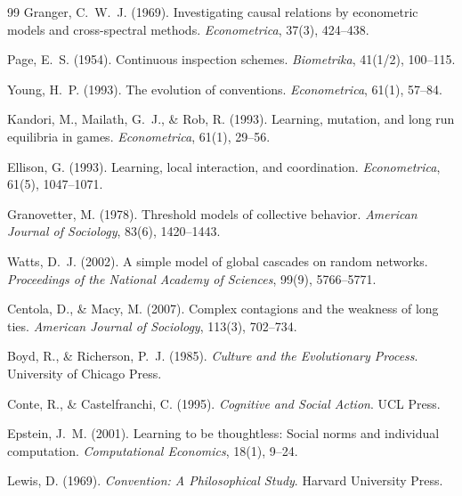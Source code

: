 \documentclass[11pt,a4paper]{article}
\begin{document}
\begin{thebibliography}{99}
Granger, C.~W.~J. (1969).
Investigating causal relations by econometric models and cross-spectral methods.
\textit{Econometrica}, 37(3), 424--438.

Page, E.~S. (1954).
Continuous inspection schemes.
\textit{Biometrika}, 41(1/2), 100--115.

Young, H.~P. (1993).
The evolution of conventions.
\textit{Econometrica}, 61(1), 57--84.

Kandori, M., Mailath, G.~J., \& Rob, R. (1993).
Learning, mutation, and long run equilibria in games.
\textit{Econometrica}, 61(1), 29--56.

Ellison, G. (1993).
Learning, local interaction, and coordination.
\textit{Econometrica}, 61(5), 1047--1071.

Granovetter, M. (1978).
Threshold models of collective behavior.
\textit{American Journal of Sociology}, 83(6), 1420--1443.

Watts, D.~J. (2002).
A simple model of global cascades on random networks.
\textit{Proceedings of the National Academy of Sciences}, 99(9), 5766--5771.

Centola, D., \& Macy, M. (2007).
Complex contagions and the weakness of long ties.
\textit{American Journal of Sociology}, 113(3), 702--734.

Boyd, R., \& Richerson, P.~J. (1985).
\textit{Culture and the Evolutionary Process}.
University of Chicago Press.

Conte, R., \& Castelfranchi, C. (1995).
\textit{Cognitive and Social Action}.
UCL Press.

Epstein, J.~M. (2001).
Learning to be thoughtless: Social norms and individual computation.
\textit{Computational Economics}, 18(1), 9--24.

Lewis, D. (1969).
\textit{Convention: A Philosophical Study}.
Harvard University Press.

\end{thebibliography}
\end{document}
